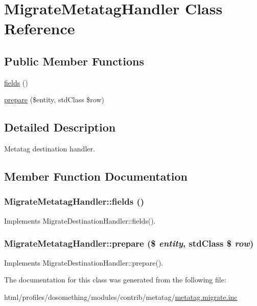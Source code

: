 \hypertarget{classMigrateMetatagHandler}{
\section{MigrateMetatagHandler Class Reference}
\label{classMigrateMetatagHandler}
}
\subsection*{Public Member Functions}
\begin{DoxyCompactItemize}
\item 
\hyperlink{classMigrateMetatagHandler_a85defe4481dfe07875790b1abd644d12}{fields} ()
\item 
\hyperlink{classMigrateMetatagHandler_a333cdd4b4ca9d88f9465fb78b14ca738}{prepare} (\$entity, stdClass \$row)
\end{DoxyCompactItemize}


\subsection{Detailed Description}
Metatag destination handler. 

\subsection{Member Function Documentation}
\hypertarget{classMigrateMetatagHandler_a85defe4481dfe07875790b1abd644d12}{
\subsubsection[{fields}]{\setlength{\rightskip}{0pt plus 5cm}MigrateMetatagHandler::fields ()}}
\label{classMigrateMetatagHandler_a85defe4481dfe07875790b1abd644d12}
Implements MigrateDestinationHandler::fields(). \hypertarget{classMigrateMetatagHandler_a333cdd4b4ca9d88f9465fb78b14ca738}{
\subsubsection[{prepare}]{\setlength{\rightskip}{0pt plus 5cm}MigrateMetatagHandler::prepare (\$ {\em entity}, \/  stdClass \$ {\em row})}}
\label{classMigrateMetatagHandler_a333cdd4b4ca9d88f9465fb78b14ca738}
Implements MigrateDestinationHandler::prepare(). 

The documentation for this class was generated from the following file:\begin{DoxyCompactItemize}
\item 
html/profiles/dosomething/modules/contrib/metatag/\hyperlink{metatag_8migrate_8inc}{metatag.migrate.inc}\end{DoxyCompactItemize}
